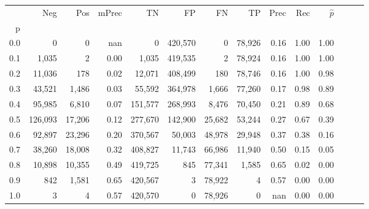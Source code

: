\begin{tabular}{rrrrrrrrrrrrrr}
\toprule
{} &      Neg &     Pos & mPrec &       TN &       FP &      FN &      TP &  Prec &   Rec & $\hat{p}$ \\
p   &          &         &       &          &          &         &         &       &       &           \\
\midrule
0.0 &        0 &       0 &   nan &        0 &  420,570 &       0 &  78,926 &  0.16 &  1.00 &      1.00 \\
0.1 &    1,035 &       2 &  0.00 &    1,035 &  419,535 &       2 &  78,924 &  0.16 &  1.00 &      1.00 \\
0.2 &   11,036 &     178 &  0.02 &   12,071 &  408,499 &     180 &  78,746 &  0.16 &  1.00 &      0.98 \\
0.3 &   43,521 &   1,486 &  0.03 &   55,592 &  364,978 &   1,666 &  77,260 &  0.17 &  0.98 &      0.89 \\
0.4 &   95,985 &   6,810 &  0.07 &  151,577 &  268,993 &   8,476 &  70,450 &  0.21 &  0.89 &      0.68 \\
0.5 &  126,093 &  17,206 &  0.12 &  277,670 &  142,900 &  25,682 &  53,244 &  0.27 &  0.67 &      0.39 \\
0.6 &   92,897 &  23,296 &  0.20 &  370,567 &   50,003 &  48,978 &  29,948 &  0.37 &  0.38 &      0.16 \\
0.7 &   38,260 &  18,008 &  0.32 &  408,827 &   11,743 &  66,986 &  11,940 &  0.50 &  0.15 &      0.05 \\
0.8 &   10,898 &  10,355 &  0.49 &  419,725 &      845 &  77,341 &   1,585 &  0.65 &  0.02 &      0.00 \\
0.9 &      842 &   1,581 &  0.65 &  420,567 &        3 &  78,922 &       4 &  0.57 &  0.00 &      0.00 \\
1.0 &        3 &       4 &  0.57 &  420,570 &        0 &  78,926 &       0 &   nan &  0.00 &      0.00 \\
\bottomrule
\end{tabular}

